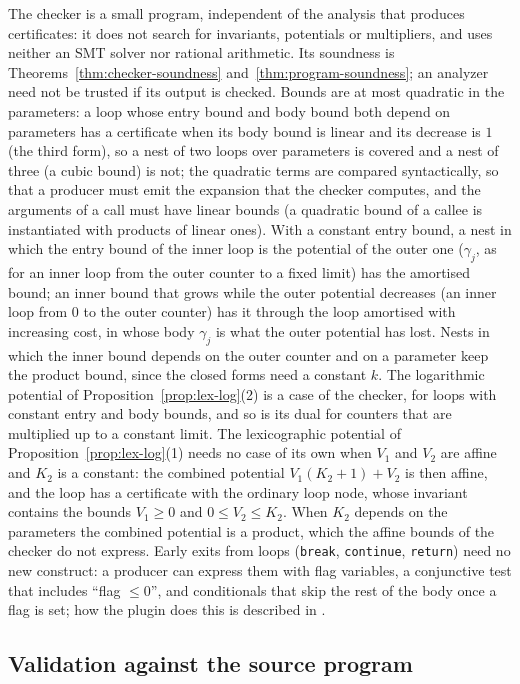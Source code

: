 \documentclass[oneside,english]{amsart}
\numberwithin{equation}{section}
\numberwithin{figure}{section}
\theoremstyle{plain}
\theoremstyle{definition}
\theoremstyle{plain}
\theoremstyle{remark}
\theoremstyle{plain}
\theoremstyle{definition}
\theoremstyle{plain}
\theoremstyle{remark}
\begin{document}
The checker is a small program, independent of the analysis that produces certificates: it does not search for invariants, potentials or multipliers, and uses neither an SMT solver nor rational arithmetic. Its soundness is Theorems~\ref{thm:checker-soundness} and~\ref{thm:program-soundness}; an analyzer need not be trusted if its output is checked. Bounds are at most quadratic in the parameters: a loop whose entry bound and body bound both depend on parameters has a certificate when its body bound is linear and its decrease is $1$ (the third form), so a nest of two loops over parameters is covered and a nest of three (a cubic bound) is not; the quadratic terms are compared syntactically, so that a producer must emit the expansion that the checker computes, and the arguments of a call must have linear bounds (a quadratic bound of a callee is instantiated with products of linear ones). With a constant entry bound, a nest in which the entry bound of the inner loop is the potential of the outer one ($\gamma_j$, as for an inner loop from the outer counter to a fixed limit) has the amortised bound; an inner bound that grows while the outer potential decreases (an inner loop from $0$ to the outer counter) has it through the loop amortised with increasing cost, in whose body $\gamma_j$ is what the outer potential has lost. Nests in which the inner bound depends on the outer counter and on a parameter keep the product bound, since the closed forms need a constant $k$. The logarithmic potential of Proposition~\ref{prop:lex-log}(2) is a case of the checker, for loops with constant entry and body bounds, and so is its dual for counters that are multiplied up to a constant limit. The lexicographic potential of Proposition~\ref{prop:lex-log}(1) needs no case of its own when $V_1$ and $V_2$ are affine and $K_2$ is a constant: the combined potential $V_1 (K_2 + 1) + V_2$ is then affine, and the loop has a certificate with the ordinary loop node, whose invariant contains the bounds $V_1 \ge 0$ and $0 \le V_2 \le K_2$. When $K_2$ depends on the parameters the combined potential is a product, which the affine bounds of the checker do not express. Early exits from loops (\texttt{break}, \texttt{continue}, \texttt{return}) need no new construct: a producer can express them with flag variables, a conjunctive test that includes ``flag $\le 0$'', and conditionals that skip the rest of the body once a flag is set; how the plugin does this is described in \cite{crosscheckTool}.

\subsection{Validation against the source program}
\label{subsec:validation}
\end{document}

